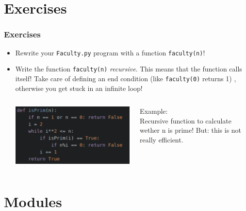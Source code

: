 \documentclass{beamer}
\begin{document}
\section{Exercises}

\begin{frame}
\frametitle{Exercises}
	\begin{itemize}
		\item Rewrite your \texttt{Faculty.py} program with a function \texttt{faculty(n)}!
		\item Write the function \texttt{faculty(n)} \textit{recursive}. This means that the function calls itself! Take care of defining an end condition (like \texttt{faculty(0)} returns 1) , otherwise you get stuck in an infinite loop! \\
		\begin{columns}[T]
		\begin{column}[T]{6cm}
			\includegraphics[width = 1\textwidth]{recursivePrim.pdf}
		\end{column}
		\begin{column}[T]{4cm}
			Example: \\
			Recursive function to calculate wether n is prime! But: this is not really efficient.
		\end{column}
		\end{columns}
	\end{itemize}
\end{frame}

\section{Modules}
\end{document}
